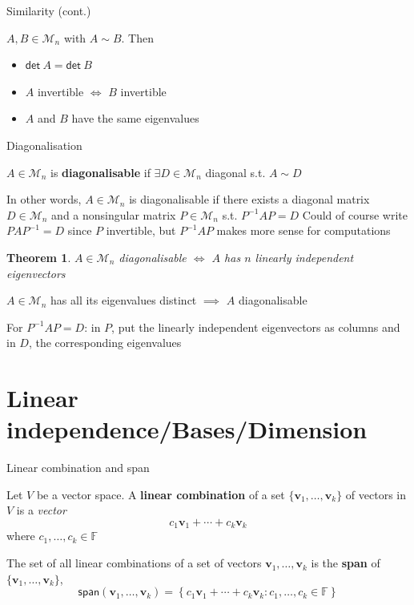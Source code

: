 \documentclass{beamer}
\def\IF{\mathbb{F}}
\def\bv{\mathbf{v}}
\def\M{\mathcal{M}}
\renewcommand{\det}{\ensuremath{\mathsf{det}}}
\renewcommand{\span}{\ensuremath{\mathsf{span}}}
\newtheorem{importanttheorem}[theorem]{Theorem}
\begin{document}
\begin{frame}{Similarity (cont.)}
\begin{theorem}
$A,B\in\M_n$ with $A\sim B$. Then
\begin{itemize}
	\item $\det\ A=\det\ B$
	\item $A$ invertible $\iff$ $B$ invertible
	\item $A$ and $B$ have the same eigenvalues
\end{itemize}
\end{theorem}
\end{frame}


\begin{frame}{Diagonalisation}
\begin{definition}[Diagonalisability]
$A\in\M_n$ is \textbf{diagonalisable} if $\exists D\in\M_n$ diagonal s.t. $A\sim D$
\end{definition}
\vfill
In other words, $A\in\M_n$ is diagonalisable if there exists a diagonal matrix $D\in\M_n$ and a nonsingular matrix $P\in\M_n$ s.t. $P^{-1}AP=D$
\vfill
Could of course write $PAP^{-1}=D$ since $P$ invertible, but $P^{-1}AP$ makes more sense for computations
\end{frame}


\begin{frame}
\begin{importanttheorem}
$A\in\M_n$ diagonalisable $\iff$ $A$ has $n$ linearly independent eigenvectors
\end{importanttheorem}
\vfill
\begin{corollary}
$A\in\M_n$ has all its eigenvalues distinct $\implies$ $A$ diagonalisable
\end{corollary}
\vfill
For $P^{-1}AP=D$: in $P$, put the linearly independent eigenvectors as columns and in $D$, the corresponding eigenvalues
\end{frame}


\section{Linear independence/Bases/Dimension}

\begin{frame}{Linear combination and span}
	\begin{definition}
		Let $V$ be a vector space.
		A \textbf{linear combination} of a set $\{\bv_1,\ldots,\bv_k\}$ of vectors in $V$ is a \emph{vector}
		\[
		c_1\bv_1+\cdots+c_k\bv_k
		\]
		where $c_1,\ldots,c_k\in\IF$
	\end{definition}
	\vfill
	\begin{definition}[Span]
		The set of all linear combinations of a set of vectors $\bv_1,\ldots,\bv_k$ is the \textbf{span} of $\{\bv_1,\ldots,\bv_k\}$,
		\[
		\span(\bv_1,\ldots,\bv_k)=
		\left\{
		c_1\bv_1+\cdots+c_k\bv_k:c_1,\ldots,c_k\in\IF
		\right\}
		\]
	\end{definition}
\end{frame}
\end{document}
